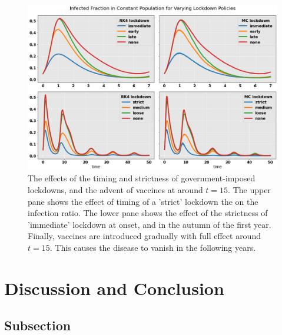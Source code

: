\documentclass[]{article}
\begin{document}
\begin{figure}[!h]
	\centering
	\includegraphics[width=1\linewidth]{./figs/covid-infection-sim.png}
	\caption{The effects of the timing and strictness of government-imposed lockdowns, and the advent of vaccines at around $t=15$. The upper pane shows the effect of timing of a 'strict' lockdown the on the infection ratio. The lower pane shows the effect of the strictness of 'immediate' lockdown at onset, and in the autumn of the first year. Finally, vaccines are introduced gradually with full effect around $t=15$. This causes the disease to vanish in the following years.}
	\label{fig:covid-infection-sim}
\end{figure}


\clearpage
\section{Discussion and Conclusion} \label{sec:conclusion}



\subsection{Subsection} \label{sec:subsection}



\end{document}
